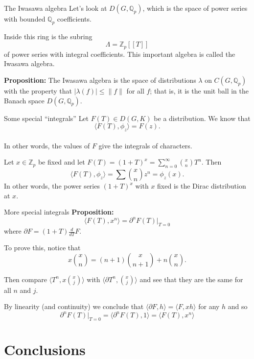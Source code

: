 \documentclass[
  ignorenonframetext,
]{beamer}
\begin{document}
\begin{frame}{The Iwasawa algebra}
\protect\hypertarget{the-iwasawa-algebra}{}
Let's look at \(D(G,\mathbb{Q}_p)\), which is the space of power series
with bounded \(\mathbb{Q}_p\) coefficients.

Inside this ring is the subring \[
\Lambda = \mathbb{Z}_p[[T]]
\] of power series with integral coefficients. This important algebra is
called the Iwasawa algebra.

\textbf{Proposition:} The Iwasawa algebra is the space of distributions
\(\lambda\) on \(C(G,\mathbb{Q}_p)\) with the property that
\(|\lambda(f)|\le \|f\|\) for all \(f\); that is, it is the unit ball in
the Banach space \(D(G,\mathbb{Q}_p)\).
\end{frame}

\begin{frame}{Some special ``integrals''}
\protect\hypertarget{some-special-integrals}{}
Let \(F(T)\in D(G,K)\) be a distribution. We know that \[
\langle F(T),\phi_z\rangle = F(z).
\]\\
In other words, the values of \(F\) give the integrals of characters.

Let \(x\in\mathbb{Z}_p\) be fixed and let
\(F(T)=(1+T)^x=\sum_{n=0}^{\infty}\binom{x}{n}T^{n}\). Then \[
\langle F(T),\phi_z\rangle = \sum\binom{x}{n}z^n=\phi_z(x).
\] In other words, the power series \((1+T)^x\) with \(x\) fixed is the
Dirac distribution at \(x\).
\end{frame}

\begin{frame}{More special integrals}
\protect\hypertarget{more-special-integrals}{}
\textbf{Proposition:} \[
\langle F(T), x^n\rangle = \partial^n F(T)|_{T=0}
\] where \(\partial F=(1+T)\frac{d}{dT}F\).

To prove this, notice that \[
x\binom{x}{n} = (n+1)\binom{x}{n+1}+n\binom{x}{n}.
\]

Then compare \(\langle T^n, x\binom{x}{j}\rangle\) with
\(\langle \partial T^{n}, \binom{x}{j}\rangle\) and see that they are
the same for all \(n\) and \(j\).

By linearity (and continuity) we conclude that
\(\langle \partial F,h\rangle = \langle F, xh\rangle\) for any \(h\) and
so \[
\partial^n F(T)|_{T=0}=\langle \partial^n F(T), 1\rangle =\langle F(T),x^n\rangle
\]
\end{frame}

\hypertarget{conclusions}{%
\section{Conclusions}\label{conclusions}}
\end{document}
